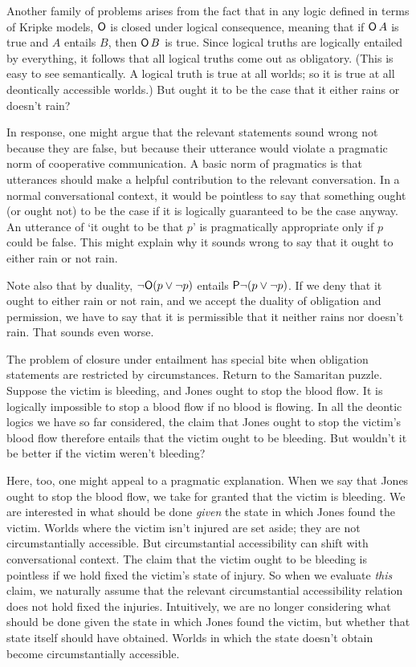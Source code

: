 
Another family of problems arises from the fact that in any logic defined in
terms of Kripke models, $\operatorname{\mathsf{O}}$ is closed under logical consequence, meaning that
if $\operatorname{\mathsf{O}} A$ is true and $A$ entails $B$, then $\operatorname{\mathsf{O}} B$ is true. Since logical
truths are logically entailed by everything, it follows that all logical truths
come out as obligatory. (This is easy to see semantically. A logical truth is
true at all worlds; so it is true at all deontically accessible worlds.) But ought it to be the case that it either rains or doesn't rain?

In response, one might argue that the relevant statements sound wrong not
because they are false, but because their utterance would violate a pragmatic
norm of cooperative communication. A basic norm of pragmatics is that utterances
should make a helpful contribution to the relevant conversation. In a normal
conversational context, it would be pointless to say that something ought (or
ought not) to be the case if it is logically guaranteed to be the case anyway.
An utterance of `it ought to be that $p$' is pragmatically appropriate only if
$p$ could be false. This might explain why it sounds wrong to say that it ought
to either rain or not rain.

Note also that by duality, $\neg\!\operatorname{\mathsf{O}}(p \lor \neg p)$ entails
$\operatorname{\mathsf{P}} \!\neg(p \lor \neg p)$. If we deny that it ought to either rain or not rain,
and we accept the duality of obligation and permission, we have to say that it
is permissible that it neither rains nor doesn't rain. That sounds even worse.

The problem of closure under entailment has special bite when obligation
statements are restricted by circumstances. Return to the Samaritan
puzzle. Suppose the victim is bleeding, and Jones ought to stop the blood
flow. It is logically impossible to stop a blood flow if no blood is flowing. In
all the deontic logics we have so far considered, the claim that Jones ought to
stop the victim's blood flow therefore entails that the victim ought to be
bleeding. But wouldn't it be better if the victim weren't bleeding?

Here, too, one might appeal to a pragmatic explanation. When we say that Jones
ought to stop the blood flow, we take for granted that the victim is bleeding.
We are interested in what should be done \emph{given} the state in which Jones
found the victim. Worlds where the victim isn't injured are set aside; they are
not circumstantially accessible. But circumstantial accessibility can shift with
conversational context. The claim that the victim ought to be bleeding is
pointless if we hold fixed the victim's state of injury. So when we evaluate
\emph{this} claim, we naturally assume that the relevant circumstantial
accessibility relation does not hold fixed the injuries. Intuitively, we are no
longer considering what should be done given the state in which Jones found the
victim, but whether that state itself should have obtained. Worlds in which
the state doesn't obtain become circumstantially accessible.

